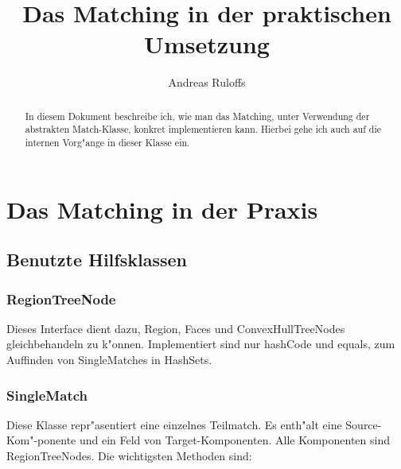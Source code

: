 \documentclass[a4paper,10pt,twoside]{scrreprt}
\title{Das Matching in der praktischen Umsetzung}
\author{Andreas Ruloffs}
\begin{document}
\maketitle

\begin{abstract}
In diesem Dokument beschreibe ich, wie man das Matching, unter Verwendung der abstrakten Match-Klasse, konkret implementieren kann. Hierbei gehe ich auch auf die internen Vorg"ange in dieser Klasse ein.
\end{abstract}
\tableofcontents
\chapter{Das Matching in der Praxis}

\section{Benutzte Hilfsklassen}
\subsection{RegionTreeNode}

Dieses Interface dient dazu, Region, Faces und ConvexHullTreeNodes gleichbehandeln zu k"onnen. Implementiert sind nur hashCode und equals, zum Auffinden von SingleMatches in HashSets.

\subsection{SingleMatch}
Diese Klasse repr"asentiert eine einzelnes Teilmatch.  Es enth"alt eine Source-Kom"-ponente und ein Feld von Target-Komponenten. Alle Komponenten sind RegionTreeNodes.
Die wichtigsten Methoden sind:
\end{document}

